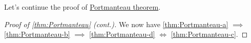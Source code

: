 Let's continue the proof of \hyperref[thm:Portmanteau]{Portmanteau theorem}.
\begin{proof}[Proof of \autoref{thm:Portmanteau} (cont.)]\label{pf:thm:Portmanteau-cont}
	We now have \autoref{thm:Portmanteau-a} \(\implies \) \autoref{thm:Portmanteau-b} \(\implies \) \autoref{thm:Portmanteau-d} \(\iff \) \autoref{thm:Portmanteau-c}.
\end{proof}